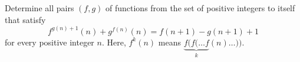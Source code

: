 Determine all pairs $(f, g)$ of functions from the set of positive integers to itself that satisfy
\[
f^{g(n)+1}(n) + g^{f(n)}(n) = f(n+1) - g(n+1) + 1
\]
for every positive integer $n$. Here, $f^k(n)$ means $\underbrace{f(f(\ldots f}_{k}(n)\ldots))$.
